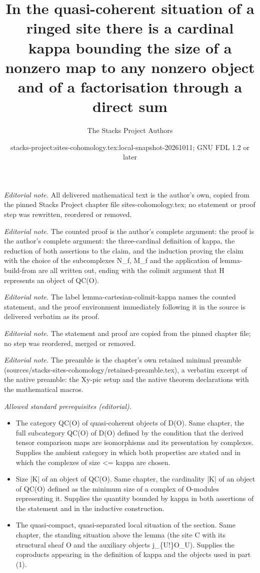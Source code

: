 \documentclass[10pt,a4paper]{amsart}
\title{In the quasi-coherent situation of a ringed site there is a cardinal kappa bounding the size of a nonzero map to any nonzero object and of a factorisation through a direct sum}
\author{The Stacks Project Authors}
\date{stacks-project:sites-cohomology.tex:local-snapshot-20261011; GNU FDL 1.2 or later}
\theoremstyle{plain}
\theoremstyle{definition}
\theoremstyle{remark}
\numberwithin{equation}{subsection}
\begin{document}
\maketitle
\noindent\textit{Editorial note.} All delivered mathematical text is the author's own, copied from the pinned Stacks Project chapter file sites-cohomology.tex; no statement or proof step was rewritten, reordered or removed.\par\medskip
\noindent\textit{Editorial note.} The counted proof is the author's complete argument: the proof is the author's complete argument: the three-cardinal definition of kappa, the reduction of both assertions to the claim, and the induction proving the claim with the choice of the subcomplexes N\_f, M\_f and the application of lemma-build-from are all written out, ending with the colimit argument that H represents an object of QC(O).\par\medskip
\noindent\textit{Editorial note.} The label lemma-cartesian-colimit-kappa names the counted statement, and the proof environment immediately following it in the source is delivered verbatim as its proof.\par\medskip
\noindent\textit{Editorial note.} The statement and proof are copied from the pinned chapter file; no step was reordered, merged or removed.\par\medskip
\noindent\textit{Editorial note.} The preamble is the chapter's own retained minimal preamble (sources/stacks-sites-cohomology/retained-preamble.tex), a verbatim excerpt of the native preamble: the Xy-pic setup and the native theorem declarations with the mathematical macros.\par\medskip
\noindent\textit{Allowed standard prerequisites (editorial).}\begin{itemize}
\item The category QC(O) of quasi-coherent objects of D(O). Same chapter, the full subcategory QC(O) of D(O) defined by the condition that the derived tensor comparison maps are isomorphisms and its presentation by complexes. Supplies the ambient category in which both properties are stated and in which the complexes of size <= kappa are chosen.
\item Size |K| of an object of QC(O). Same chapter, the cardinality |K| of an object of QC(O) defined as the minimum size of a complex of O-modules representing it. Supplies the quantity bounded by kappa in both assertions of the statement and in the inductive construction.
\item The quasi-compact, quasi-separated local situation of the section. Same chapter, the standing situation above the lemma (the site C with its structural sheaf O and the auxiliary objects j\_\{U!\}O\_U). Supplies the coproducts appearing in the definition of kappa and the objects used in part (1).
\end{itemize}\medskip
\end{document}
